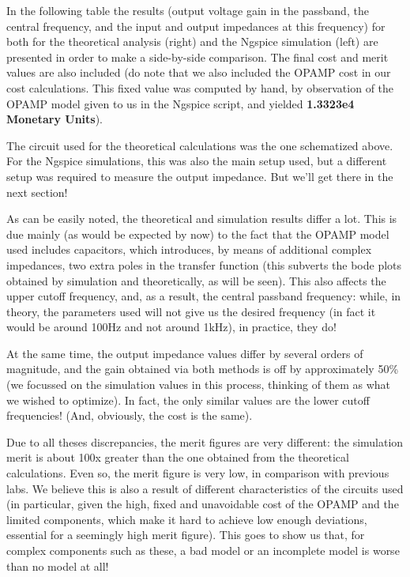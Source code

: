 In the following table the results (output voltage gain in the passband, the central frequency, and the input and output impedances at this frequency) for both for the theoretical analysis (right) and the Ngspice simulation (left) are presented in order to make a side-by-side comparison. The final cost and merit values are also included (do note that we also included the OPAMP cost in our cost calculations. This fixed value was computed by hand, by observation of the OPAMP model given to us in the Ngspice script, and yielded \textbf{1.3323e4 Monetary Units}).\par
The circuit used for the theoretical calculations was the one schematized above. For the Ngspice simulations, this was also the main setup used, but a different setup was required to measure the output impedance. But we'll get there in the next section!\par
As can be easily noted, the theoretical and simulation results differ a lot. This is due mainly (as would be expected by now) to the fact that the OPAMP model used includes capacitors, which introduces, by means of additional complex impedances, two extra poles in the transfer function (this subverts the bode plots obtained by simulation and theoretically, as will be seen). This also affects the upper cutoff frequency, and, as a result, the central passband frequency: while, in theory, the parameters used will not give us the desired frequency (in fact it would be around 100Hz and not around 1kHz), in practice, they do! \par
At the same time, the output impedance values differ by several orders of magnitude, and the gain obtained via both methods is off by approximately 50\% (we focussed on the simulation values in this process, thinking of them as what we wished to optimize). In fact, the only similar values are the lower cutoff frequencies! (And, obviously, the cost is the same).\par
Due to all theses discrepancies, the merit figures are very different: the simulation merit is about 100x greater than the one obtained from the theoretical calculations. Even so, the merit figure is very low, in comparison with previous labs. We believe this is also a result of different characteristics of the circuits used (in particular, given the high, fixed and unavoidable cost of the OPAMP and the limited components, which make it hard to achieve low enough deviations, essential for a seemingly high merit figure). This goes to show us that, for complex components such as these, a bad model or an incomplete model is worse than no model at all!\par

